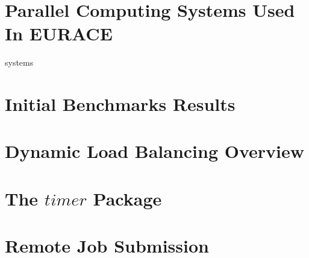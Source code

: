 \appendix
\section{Parallel Computing Systems Used In EURACE}  {systems}
\section{Initial Benchmarks Results} 
\section{Dynamic Load Balancing Overview} 
\section{The $timer$ Package}\label{timer} 
\section{Remote Job Submission} 

